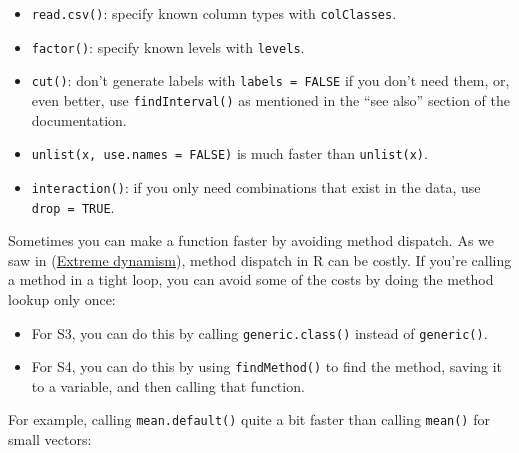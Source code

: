 \begin{itemize}
\item
  \texttt{read.csv()}: specify known column types with
  \texttt{colClasses}.
\item
  \texttt{factor()}: specify known levels with \texttt{levels}.
\item
  \texttt{cut()}: don't generate labels with \texttt{labels = FALSE} if
  you don't need them, or, even better, use \texttt{findInterval()} as
  mentioned in the ``see also'' section of the documentation.
\item
  \texttt{unlist(x, use.names = FALSE)} is much faster than
  \texttt{unlist(x)}.
\item
  \texttt{interaction()}: if you only need combinations that exist in
  the data, use \texttt{drop = TRUE}.
\end{itemize}

Sometimes you can make a function faster by avoiding method dispatch. As
we saw in (\hyperref[extreme-dynamism]{Extreme dynamism}), method
dispatch in R can be costly. If you're calling a method in a tight loop,
you can avoid some of the costs by doing the method lookup only once:

\begin{itemize}
\item
  For S3, you can do this by calling \texttt{generic.class()} instead of
  \texttt{generic()}.
\item
  For S4, you can do this by using \texttt{findMethod()} to find the
  method, saving it to a variable, and then calling that function.
\end{itemize}

For example, calling \texttt{mean.default()} quite a bit faster than
calling \texttt{mean()} for small vectors:

\begin{Shaded}
\begin{Highlighting}[]
\StringTok{ }\NormalTok{(}\NormalTok{)}

\NormalTok{(}
\NormalTok{)}
\end{Highlighting}
\end{Shaded}

